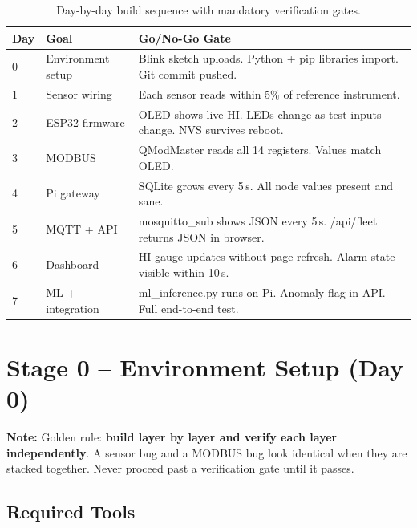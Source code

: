 \documentclass[12pt,a4paper]{article}
\newenvironment{notebox}{%
  \begin{mdframed}[backgroundcolor=notebg,linecolor=noteln,linewidth=1.5pt,
    innerleftmargin=9pt,innerrightmargin=9pt,innertopmargin=5pt,innerbottommargin=5pt]
  \textbf{\color{noteln}Note: }}{\end{mdframed}}
\begin{document}
\begin{table}[H]
\centering
\begin{tabularx}{\textwidth}{llX}
\toprule
\textbf{Day} & \textbf{Goal} & \textbf{Go/No-Go Gate} \\
\midrule
0 & Environment setup  & Blink sketch uploads. Python + pip libraries import. Git commit pushed. \\
1 & Sensor wiring      & Each sensor reads within 5\% of reference instrument. \\
2 & ESP32 firmware     & OLED shows live HI. LEDs change as test inputs change. NVS survives reboot. \\
3 & MODBUS             & QModMaster reads all 14 registers. Values match OLED. \\
4 & Pi gateway         & SQLite grows every 5\,s. All node values present and sane. \\
5 & MQTT + API         & mosquitto\_sub shows JSON every 5\,s. /api/fleet returns JSON in browser. \\
6 & Dashboard          & HI gauge updates without page refresh. Alarm state visible within 10\,s. \\
7 & ML + integration   & ml\_inference.py runs on Pi. Anomaly flag in API. Full end-to-end test. \\
\bottomrule
\end{tabularx}
\caption{Day-by-day build sequence with mandatory verification gates.}
\end{table}

\section{Stage 0 -- Environment Setup (Day 0)}

\begin{notebox}
Golden rule: \textbf{build layer by layer and verify each layer independently}. A sensor bug and a MODBUS
bug look identical when they are stacked together. Never proceed past a verification gate until it passes.
\end{notebox}

\subsection{Required Tools}
\end{document}
